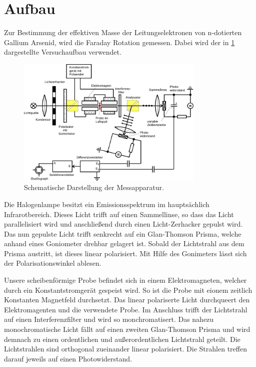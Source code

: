 \section{Aufbau}
\label{sec:Aufbau}

Zur Bestimmung der effektiven Masse der Leitungselektronen von n-dotierten Gallium Arsenid, wird die Faraday Rotation
gemessen. Dabei wird der in \ref{fig:apparatur} dargestellte Versuchaufbau verwendet.

\begin{figure}[H]
    \centering
    \includegraphics[width=0.8\textwidth]{content/grafik/apparatur.pdf}
    \caption{Schematische Darstellung der Messapparatur. \cite{faraday}}
    \label{fig:apparatur}
\end{figure}

Die Halogenlampe besitzt ein Emissionsspektrum im hauptsächlich Infrarotbereich. Dieses Licht trifft auf einen
Sammellinse, so dass das Licht parallelisiert wird und anschließend durch einen Licht-Zerhacker gepulst wird.
Das nun gepulste Licht trifft senkrecht auf ein Glan-Thomson Prisma, welche anhand eines Goniometer drehbar gelagert ist.
Sobald der Lichtstrahl aus dem Prisma austritt, ist dieses linear polarisiert. Mit Hilfe des Gonimeters lässt sich 
der Polarisationswinkel ablesen. 

Unsere scheibenförmige Probe befindet sich in einem Elektromagneten, welcher durch ein Konstantstromgerät gespeist wird.
So ist die Probe mit eionem zeitlich Konstanten Magnetfeld durchsetzt.
Das linear polariserte Licht durchqueert den Elektromagenten und die verwendete Probe.
Im Anschluss trifft der Lichtstrahl auf einen Interferenzfilter und wird so monchromatisert.
Das nahezu monochromatische Licht fällt auf einen zweiten Glan-Thomson Prisma und wird demnach
zu einen ordentlichen und außerordentlichen Lichtstrahl geteilt. Die Lichtstrahlen sind orthogonal zueinander linear polarisiert.
Die Strahlen treffen darauf jeweils auf einen Photowiderstand.

